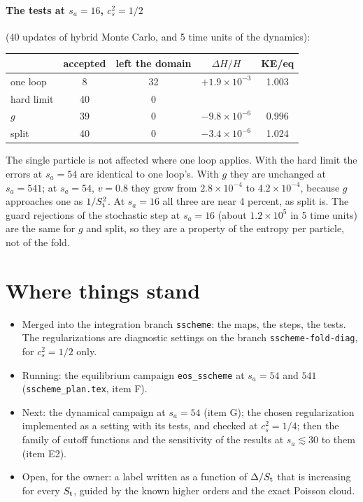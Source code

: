 \documentclass[11pt,aps,preprint,nofootinbib,superscriptaddress,tightenlines]{revtex4-2}
\let\oldparagraph\paragraph
\renewcommand{\paragraph}{\par\bigskip\oldparagraph}
\begin{document}
\paragraph{The tests at $s_a=16$, $c_s^2=1/2$} (40 updates of hybrid Monte Carlo, and 5 time units of the dynamics):
\begin{center}\small
\begin{tabular}{lcccc}
\toprule
 & accepted & left the domain & $\Delta H/H$ & KE/eq \\
\midrule
one loop & 8 & 32 & $+1.9\times10^{-3}$ & 1.003 \\
hard limit & 40 & 0 & & \\
$g$ & 39 & 0 & $-9.8\times10^{-6}$ & 0.996 \\
split & 40 & 0 & $-3.4\times10^{-6}$ & 1.024 \\
\bottomrule
\end{tabular}
\end{center}
The single particle is not affected where one loop applies.  With the hard limit the errors at $s_a=54$ are identical to one loop's.  With $g$ they are
unchanged at $s_a=541$; at $s_a=54$, $v=0.8$ they grow from $2.8\times10^{-4}$ to $4.2\times10^{-4}$, because $g$ approaches one as $1/S_{\rm t}^2$.  At $s_a=16$
all three are near 4 percent, as split is.  The guard rejections of the stochastic step at $s_a=16$ (about $1.2\times10^5$ in 5 time units) are the same
for $g$ and split, so they are a property of the entropy per particle, not of the fold.

\section{Where things stand}
\label{sec:next}

\begin{itemize}
\item Merged into the integration branch \texttt{sscheme}: the maps, the steps, the tests.  The regularizations are diagnostic settings on the branch
  \texttt{sscheme-fold-diag}, for $c_s^2=1/2$ only.
\item Running: the equilibrium campaign \texttt{eos\_sscheme} at $s_a=54$ and $541$ (\nolinkurl{sscheme_plan.tex}, item F).
\item Next: the dynamical campaign at $s_a=54$ (item G); the chosen regularization implemented as a setting with its tests, and checked at $c_s^2=1/4$;
  then the family of cutoff functions and the sensitivity of the results at $s_a\lesssim30$ to them (item E2).
\item Open, for the owner: a label written as a function of $\Delta/S_{\rm t}$ that is increasing for every $S_{\rm t}$, guided by the known higher orders and the
  exact Poisson cloud.
\end{itemize}
\end{document}
